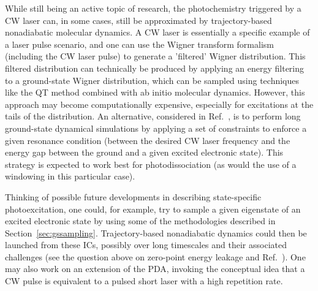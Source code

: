 \documentclass[9pt,bestpractices,pubversion]{livecoms}
\begin{document}
\begin{itemize}
{While still being an active topic of research, the photochemistry triggered by a CW laser can, in some cases, still be approximated by trajectory-based nonadiabatic molecular dynamics.\cite{suchan2018importance} A CW laser is essentially a specific example of a laser pulse scenario, and one can use the Wigner transform formalism (including the CW laser pulse) to generate a 'filtered' Wigner distribution. This filtered distribution can technically be produced by applying an energy filtering to a ground-state Wigner distribution, which can be sampled using techniques like the QT method combined with ab initio molecular dynamics. However, this approach may become computationally expensive, especially for excitations at the tails of the distribution. An alternative, considered in Ref.~, is to perform long ground-state dynamical simulations by applying a set of constraints to enforce a given resonance condition (between the desired CW laser frequency and the energy gap between the ground and a given excited electronic state). This strategy is expected to work best for photodissociation (as would the use of a windowing in this particular case).

Thinking of possible future developments in describing state-specific photoexcitation, one could, for example, try to sample a given eigenstate of an excited electronic state by using some of the methodologies described in Section~\ref{sec:gssampling}. Trajectory-based nonadiabatic dynamics could then be launched from these ICs, possibly over long timescales and their associated challenges (see the question above on zero-point energy leakage and Ref.~). One may also work on an extension of the PDA, invoking the conceptual idea that a CW pulse is equivalent to a pulsed short laser with a high repetition rate.\cite{heller2018semiclassical}
}


\end{itemize}
\end{document}
